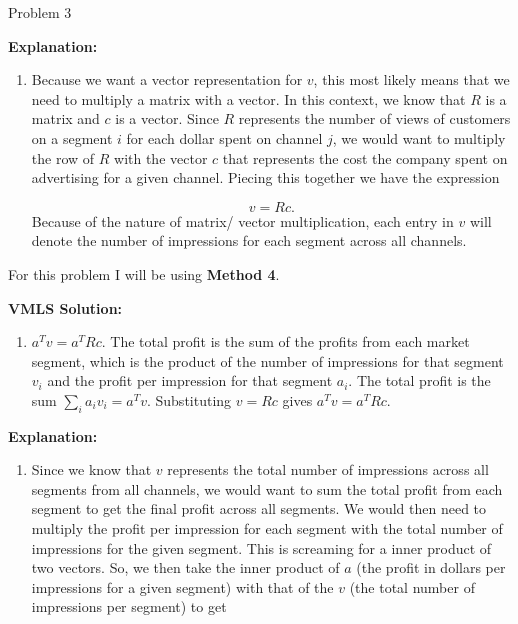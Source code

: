 \begin{problem}{Problem 3}
\begin{Highlight}
        \noindent \textbf{Explanation:}

        \begin{enumerate}[label = (\alph*), start = 2]
            \item Because we want a vector representation for $v$, this most likely means that we need to multiply a matrix with a vector. In this context, we know that $R$ is a matrix and $c$ is a 
            vector. Since $R$ represents the number of views of customers on a segment $i$ for each dollar spent on channel $j$, we would want to multiply the row of $R$ with the vector $c$ that represents
            the cost the company spent on advertising for a given channel. Piecing this together we have the expression

            \begin{equation}
                v = Rc.
            \end{equation}
            Because of the nature of matrix/ vector multiplication, each entry in $v$ will denote the number of impressions for each segment across all channels.
        \end{enumerate}
    \end{Highlight}

    \begin{Highlight}
        For this problem I will be using \textbf{Method 4}. \vspace*{1em}

        \noindent \textbf{VMLS Solution:}

        \begin{enumerate}[label = (\alph*), start = 3]
            \item $a^{T}v = a^{T}Rc$. The total profit is the sum of the profits from each market segment, which is the product of the number of impressions for that segment $v_{i}$ and the profit 
            per impression for that segment $a_{i}$. The total profit is the sum $\sum_{i} a_{i}v_{i} = a^{T}v$. Substituting $v = Rc$ gives $a^{T}v = a^{T}Rc$.
        \end{enumerate}

        \noindent \textbf{Explanation:}

        \begin{enumerate}[label = (\alph*), start = 3]
            \item Since we know that $v$ represents the total number of impressions across all segments from all channels, we would want to sum the total profit from each segment to get the final 
            profit across all segments. We would then need to multiply the profit per impression for each segment with the total number of impressions for the given segment. This is screaming for a
            inner product of two vectors. So, we then take the inner product of $a$ (the profit in dollars per impressions for a given segment) with that of the $v$ (the total number of impressions 
            per segment) to get


\end{enumerate}
\end{Highlight}
\end{problem}
